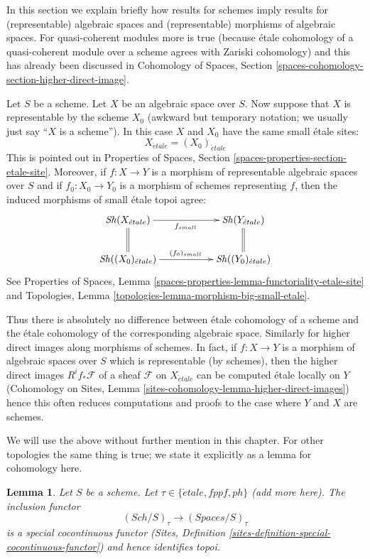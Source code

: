 \documentclass{stacks-project}
\theoremstyle{plain}
\newtheorem{lemma}[subsection]{Lemma}
\theoremstyle{definition}
\theoremstyle{remark}
\numberwithin{equation}{subsection}
\def\Sch{\mathit{Sch}}
\def\Sh{\mathop{\mathit{Sh}}\nolimits}
\def\etale{{\acute{e}tale}}
\begin{document}
\noindent
In this section we explain briefly how results for schemes
imply results for (representable) algebraic spaces and
(representable) morphisms of algebraic spaces.
For quasi-coherent modules more is true
(because \'etale cohomology of a quasi-coherent module
over a scheme agrees with Zariski cohomology) and this
has already been discussed in Cohomology of Spaces, Section
\ref{spaces-cohomology-section-higher-direct-image}.

\medskip\noindent
Let $S$ be a scheme. Let $X$ be an algebraic space over $S$.
Now suppose that $X$ is representable by the scheme $X_0$
(awkward but temporary notation; we usually just say ``$X$
is a scheme''). In this case $X$ and $X_0$ have the same small
\'etale sites:
$$
X_\etale = (X_0)_\etale
$$
This is pointed out in
Properties of Spaces, Section \ref{spaces-properties-section-etale-site}.
Moreover, if $f : X \to Y$ is a morphism of representable algebraic spaces
over $S$ and if $f_0 : X_0 \to Y_0$ is a morphism of
schemes representing $f$, then the induced morphisms of small
\'etale topoi agree:
$$
\xymatrix{
\Sh(X_\etale) \ar[rr]_{f_{small}} \ar@{=}[d] & &
\Sh(Y_\etale) \ar@{=}[d] \\
\Sh((X_0)_\etale) \ar[rr]^{(f_0)_{small}} & &
\Sh((Y_0)_\etale)
}
$$
See Properties of Spaces, Lemma
\ref{spaces-properties-lemma-functoriality-etale-site} and
Topologies, Lemma \ref{topologies-lemma-morphism-big-small-etale}.

\medskip\noindent
Thus there is absolutely no difference between \'etale cohomology
of a scheme and the \'etale cohomology of the corresponding algebraic space.
Similarly for higher direct images along morphisms of schemes.
In fact, if $f : X \to Y$ is a morphism of algebraic spaces over $S$
which is representable (by schemes), then the higher direct images
$R^if_*\mathcal{F}$ of a sheaf $\mathcal{F}$ on $X_\etale$
can be computed \'etale locally on $Y$ (Cohomology on Sites,
Lemma \ref{sites-cohomology-lemma-higher-direct-images})
hence this often reduces computations and proofs to the case
where $Y$ and $X$ are schemes.

\medskip\noindent
We will use the above without further mention in this chapter.
For other topologies the same thing is true; we state it
explicitly as a lemma for cohomology here.

\begin{lemma}
\label{lemma-compare-cohomology-other-topologies}
Let $S$ be a scheme. Let $\tau \in \{\etale, fppf, ph\}$ (add more here).
The inclusion functor
$$
(\Sch/S)_\tau \longrightarrow (\textit{Spaces}/S)_\tau
$$
is a special cocontinuous functor
(Sites, Definition \ref{sites-definition-special-cocontinuous-functor})
and hence identifies topoi.
\end{lemma}
\end{document}
